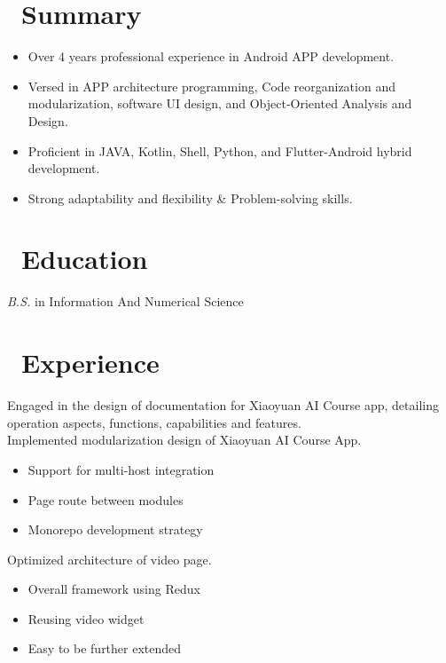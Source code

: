 \documentclass{resume}
\begin{document}



\section{\faStarO\ Summary}
\begin{itemize}[parsep=0.5ex]
  \item Over 4 years professional experience in Android APP development.
  \item Versed in APP architecture programming, Code reorganization and modularization,
  software UI design, and Object-Oriented Analysis and Design.
  \item Proficient in JAVA, Kotlin, Shell, Python, and Flutter-Android hybrid development.
  \item Strong adaptability and flexibility \& Problem-solving skills.
\end{itemize}

\section{\faGraduationCap\ Education}
\textit{B.S.} in Information And Numerical Science

\section{\faUsers\ Experience}
Engaged in the design of documentation for Xiaoyuan AI Course app, detailing operation aspects, functions, capabilities and features.\\
Implemented modularization design of Xiaoyuan AI Course App.
\begin{itemize}
  \item Support for multi-host integration
  \item Page route between modules
  \item Monorepo development strategy
\end{itemize}
Optimized architecture of video page.
\begin{itemize}
  \item Overall framework using Redux
  \item Reusing video widget
  \item Easy to be further extended
\end{itemize}
\end{document}
